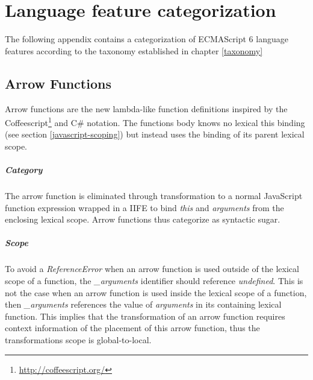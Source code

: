 
\chapter{Language feature categorization} %

\label{AppendixB} %


The following appendix contains a categorization of ECMAScript 6 language features according to the taxonomy established in chapter \ref{taxonomy}

\section{Arrow Functions} \label{arrow}
Arrow functions\cite[14.2]{SpecJS} are the new lambda-like function definitions inspired by the Coffeescript\footnote{\url{http://coffeescript.org/}} and C\# notation. The functions body knows no lexical this binding (see section \ref{javascript-scoping}) but instead uses the binding of its parent lexical scope.

\paragraph{Category}
The arrow function is eliminated through transformation to a normal JavaScript function expression wrapped in a IIFE to bind \textit{this} and \textit{arguments} from the enclosing lexical scope. Arrow functions thus categorize as syntactic sugar.

\paragraph{Scope}
To avoid a \textit{ReferenceError} when an arrow function is used outside of the lexical scope of a function, the \textit{\_arguments} identifier should reference \textit{undefined}. This is not the case when an arrow function is used inside the lexical scope of a function, then \textit{\_arguments} references the value of \textit{arguments} in its containing lexical function. This implies that the transformation of an arrow function requires context information of the placement of this arrow function, thus the transformations scope is global-to-local.

